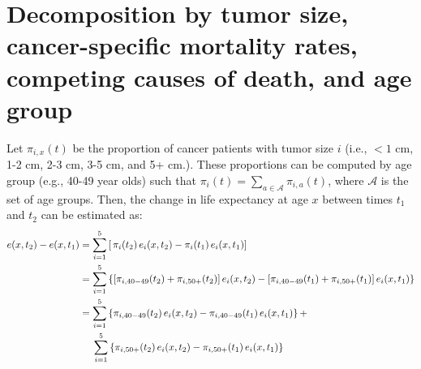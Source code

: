 \documentclass[12pt,letterpaper]{article}
\theoremstyle{plain}
\begin{document}
\section*{Decomposition by tumor size, cancer-specific mortality
  rates, competing causes of death, and age group}
Let $\pi_{i,x}(t)$ be the proportion of cancer patients with tumor
size $i$ (i.e., $<1$ cm, 1-2 cm, 2-3 cm, 3-5 cm, and 5+ cm.). These
proportions can be computed by age group (e.g., 40-49 year olds) such
that $\pi_i(t)=\sum_{a\in\mathcal{A}}\pi_{i,a}(t)$, where
$\mathcal{A}$ is the set of age groups.  Then, the change in life
expectancy at age $x$ between times $t_1$ and $t_2$ can be estimated
as: 
\begin{align*}
  e(x,t_2)-e(x,t_1)&=\sum_{i=1}^{5}\left[\,\pi_i(t_2)\,e_i(x,t_2)- \pi_i(t_1)\,e_i(x,t_1)\right] \notag\\
  &= \sum_{i=1}^{5}\left\{[\pi_{i,40-49}(t_2)+\pi_{i,50+}(t_2)]\,e_i(x,t_2)- [\pi_{i,40-49}(t_1)+\pi_{i,50+}(t_1)]\,e_i(x,t_1)\right\}\notag \\
  &=\sum_{i=1}^{5}\left\{\pi_{i,40-49}(t_2)\,e_i(x,t_2)-
    \pi_{i,40-49}(t_1)\,e_i(x,t_1)\right\} +\\
  &\hspace{0.18in}\sum_{i=1}^{5}\left\{\pi_{i,50+}(t_2)\,e_i(x,t_2)- \pi_{i,50+}(t_1)\,e_i(x,t_1)\right\} \notag 
 \end{align*}
\end{document}
